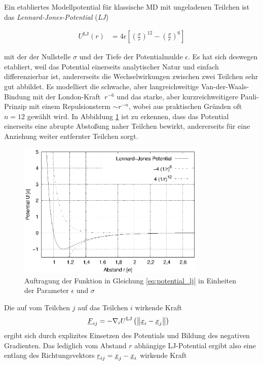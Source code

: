 		Ein etabliertes Modellpotential für klassische MD mit ungeladenen Teilchen ist das
		\emph{Lennard-Jones-Potential} (\emph{LJ})

		\begin{align}
			U^\text{LJ}(r) &= 4\epsilon \left[
				\left(\frac{\sigma}{r}\right)^{12}
				-
				\left(\frac{\sigma}{r}\right)^{6}
			\right]
			\label{eq:potential_lj}
		\end{align}

		mit der der Nullstelle $\sigma$ und der Tiefe der Potentialmulde $\epsilon$. Es hat sich
		deswegen etabliert, weil das Potential einerseits analytischer Natur und einfach
		differenzierbar ist, andererseits die Wechselwirkungen zwischen zwei Teilchen sehr gut
		abbildet. Es modelliert die schwache, aber langreichweitige Van-der-Waals-Bindung mit der
		London-Kraft $~ r^{-6}$ und das starke, aber kurzreichweitigere Pauli-Prinzip mit einem
		Repulsionsterm $\sim r^{-n}$, wobei aus praktischen Gründen oft $n=12$ gewählt wird. In
		Abbildung \ref{fig:potential_lj} ist zu erkennen, dass das Potential einerseits eine
		abrupte Abstoßung naher Teilchen bewirkt, andererseits für eine Anziehung weiter
		entfernter Teilchen sorgt.

		\begin{figure}[!ht]
			\centering
			\includegraphics[width=0.8\textwidth]{chapter/main/theory/plt/lennard_jones.eps}
			\caption{Auftragung der Funktion in Gleichung \eqref{eq:potential_lj} in Einheiten
			der Parameter $\epsilon$ und $\sigma$}
			\label{fig:potential_lj}
		\end{figure}

		Die auf vom Teilchen $j$ auf das Teilchen $i$ wirkende Kraft
		\begin{align}
			\underline{F}_{ij} &= -\nabla_i U^\text{LJ}\left(
				\left\|\underline{x}_i - \underline{x}_j\right\|
			\right)
		\end{align}
		ergibt sich durch explizites Einsetzen des Potentials und Bildung des negativen Gradienten.
		Das lediglich vom Abstand $r$ abhängige LJ-Potential ergibt also eine entlang des
		Richtungsvektors $\underline{r}_{ij} = \underline{x}_j - \underline{x}_i$ wirkende Kraft

